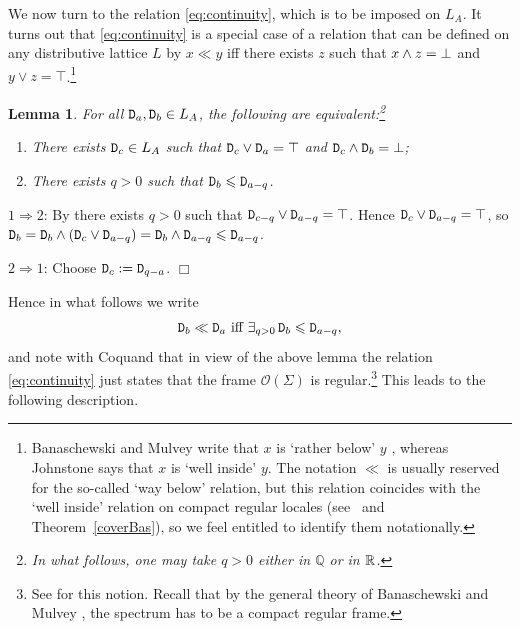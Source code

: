 \documentclass[11pt]{article}
\newcommand{\beq}{\begin{equation}}
\newcommand{\eeq}{\end{equation}}
\newcommand{\er}{\eqref}
\newcommand{\Sg}{\Sigma} \newcommand{\ta}{\tau} \newcommand{\ph}{\phi}
\newcommand{\CO}{{\mathcal O}} \newcommand{\CP}{{\mathcal P}}
\newcommand{\prop}[1]{\ensuremath{\mbox{\texttt{#1}}}}
\newtheorem{lemma}[theorem]{Lemma}
\newenvironment{proof}[1][Proof]%
{ \begin{trivlist}%
  \item[\hskip \labelsep {\bfseries #1}]%
}%
{ \end{trivlist}%
}
\newcommand{\qed}{\nobreak\hfill$\Box$}
\begin{document}
We now turn to the relation \er{eq:continuity}, which is to be imposed on $L_A$. 
It turns out that \er{eq:continuity}
 is a special case of a relation that can be defined on any distributive lattice $L$ by $x\ll y$ iff there exists $z$ such that $x\wedge z=\bot$ and $y\vee z=\top$.\footnote{Banaschewski and Mulvey write that $x$ is `rather below' $y$ \cite{banaschewskimulvey06}, whereas Johnstone \cite{johnstone82} says that  $x$ is `well inside' $y$. The notation $\ll$ is usually reserved for the so-called `way below' relation, but this relation coincides with the `well inside' relation on compact regular locales (see~\cite[p.303]{johnstone82} and Theorem~\ref{coverBas}), so we feel entitled to identify them notationally.}  
\begin{lemma}\label{l23}
For all $\prop{D}_a,\prop{D}_b\in L_A$, the following are equivalent:\footnote{In what follows, one may take $q>0$ either in $\mathbb{Q}$ or in ${\mathbb R}$.}
\begin{enumerate}
\item There exists  $\prop{D}_c\in L_A$ such that $\prop{D}_{c}\vee\prop{D}_{a}=\top$ and
$\prop{D}_{c}\wedge \prop{D}_{b}=\bot$;
\item There exists  $q>0$ such that $\prop{D}_{b}\leqslant \prop{D}_{a-q}$.
\end{enumerate}
\end{lemma}
\begin{proof}
$1\Rightarrow 2$: By \cite[Cor 1.7]{coquand05} there exists $q>0$ such
that $\prop{D}_{c-q}\vee \prop{D}_{a-q}=\top$. Hence $\prop{D}_{c}\vee \prop{D}_{a-q}=\top$, so
$\prop{D}_{b}=\prop{D}_{b}\wedge (\prop{D}_{c}\vee \prop{D}_{a-q}) = \prop{D}_{b}\wedge \prop{D}_{a-q}\leqslant \prop{D}_{a-q}$.

$2\Rightarrow 1$: Choose $\prop{D}_c:=\prop{D}_{q-a}$.
\qed\end{proof}

Hence in what follows we write
 \beq 
 \prop{D}_b\ll
\prop{D}_a \mbox{ iff } \exists_{q >0}\,  \prop{D}_b\leqslant \prop{D}_{a-q}, \label{ssnot}\eeq
and note with Coquand \cite{coquand05} that in view of the above lemma the relation  \er{eq:continuity}
 just states that the frame $\CO(\Sg)$ is regular.\footnote{See \cite[III.1.1]{johnstone82} for this notion. Recall that by the general theory of Banaschewski and Mulvey \cite{banaschewskimulvey06}, the spectrum has to be a compact regular frame.} This leads to the following description. 
  
\end{document}

